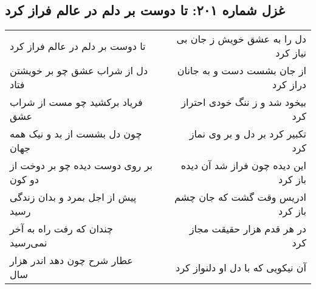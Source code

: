\begin{center}
\section*{غزل شماره ۲۰۱: تا دوست بر دلم در عالم فراز کرد}
\label{sec:201}
\begin{longtable}{l p{0.5cm} r}
تا دوست بر دلم در عالم فراز کرد
&&
دل را به عشق خویش ز جان بی نیاز کرد
\\
دل از شراب عشق چو بر خویشتن فتاد
&&
از جان بشست دست و به جانان دراز کرد
\\
فریاد برکشید چو مست از شراب عشق
&&
بیخود شد و ز ننگ خودی احتراز کرد
\\
چون دل بشست از بد و نیک همه جهان
&&
تکبیر کرد بر دل و بر وی نماز کرد
\\
بر روی دوست دیده چو بر دوخت از دو کون
&&
این دیده چون فراز شد آن دیده باز کرد
\\
پیش از اجل بمرد و بدان زندگی رسید
&&
ادریس وقت گشت که جان چشم باز کرد
\\
چندان که رفت راه به آخر نمی‌رسید
&&
در هر قدم هزار حقیقت مجاز کرد
\\
عطار شرح چون دهد اندر هزار سال
&&
آن نیکویی که با دل او دلنواز کرد
\\
\end{longtable}
\end{center}
